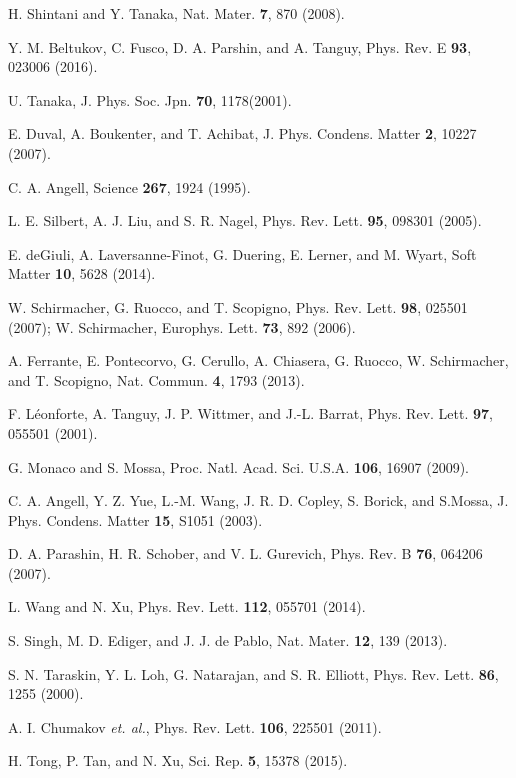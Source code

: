 \documentclass[twocolumn,printnumbers,amsmath,amssymb,prl,verbatim]{revtex4}
\begin{document}
\begin{thebibliography}{50}
 H. Shintani and Y. Tanaka, Nat. Mater. {\bf 7}, 870 (2008).

 Y. M. Beltukov, C. Fusco, D. A. Parshin, and A. Tanguy, Phys. Rev. E {\bf 93}, 023006 (2016).

 U. Tanaka, J. Phys. Soc. Jpn. {\bf 70}, 1178(2001).

 E. Duval, A. Boukenter, and T. Achibat, J. Phys. Condens. Matter {\bf 2}, 10227 (2007).

 C. A. Angell, Science {\bf 267}, 1924 (1995).

 L. E. Silbert, A. J. Liu, and S. R. Nagel, Phys. Rev. Lett. {\bf 95}, 098301 (2005).

 E. deGiuli, A. Laversanne-Finot, G. Duering, E. Lerner, and M. Wyart, Soft Matter {\bf 10}, 5628 (2014).

 W. Schirmacher, G. Ruocco, and T. Scopigno, Phys. Rev. Lett. {\bf 98}, 025501 (2007); W. Schirmacher, Europhys. Lett. {\bf 73}, 892 (2006).

 A. Ferrante, E. Pontecorvo, G. Cerullo, A. Chiasera, G. Ruocco, W. Schirmacher, and T. Scopigno, Nat. Commun. {\bf 4}, 1793 (2013).

 F. L\'{e}onforte, A. Tanguy, J. P. Wittmer, and J.-L. Barrat, Phys. Rev. Lett. {\bf 97}, 055501 (2001).

 G. Monaco and S. Mossa, Proc. Natl. Acad. Sci. U.S.A. {\bf 106}, 16907 (2009).

 C. A. Angell, Y. Z. Yue, L.-M. Wang, J. R. D. Copley, S. Borick, and S.Mossa, J. Phys. Condens. Matter {\bf 15}, S1051 (2003).

 D. A. Parashin, H. R. Schober, and V. L. Gurevich, Phys. Rev. B {\bf 76}, 064206 (2007).

 L. Wang and N. Xu, Phys. Rev. Lett. {\bf 112}, 055701 (2014).

 S. Singh, M. D. Ediger, and J. J. de Pablo, Nat. Mater. {\bf 12}, 139 (2013).

 S. N. Taraskin, Y. L. Loh, G. Natarajan, and S. R. Elliott, Phys. Rev. Lett. {\bf 86}, 1255 (2000).

 A. I. Chumakov {\it et. al.}, Phys. Rev. Lett. {\bf 106}, 225501 (2011).

 H. Tong, P. Tan, and N. Xu, Sci. Rep. {\bf 5}, 15378 (2015).


\end{thebibliography}
\end{document}
